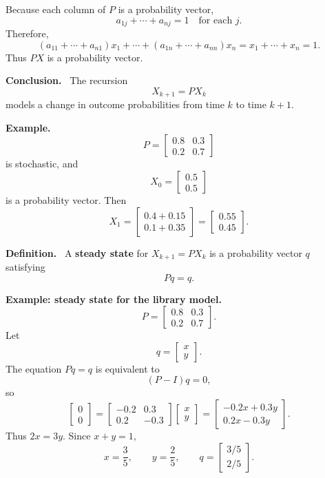 \documentclass[letterpaper]{article}
\newcommand{\noteheader}[1]{\par\medskip\noindent\textbf{#1}\ }
\begin{document}
\clearpage

Because each column of $P$ is a probability vector,
\[
a_{1j}+\cdots+a_{nj}=1
\quad\text{for each }j.
\]
Therefore,
\[
(a_{11}+\cdots+a_{n1})x_1+\cdots+(a_{1n}+\cdots+a_{nn})x_n
=x_1+\cdots+x_n=1.
\]
Thus $PX$ is a probability vector.

\bigskip

\noteheader{Conclusion.} The recursion
\[
X_{k+1}=PX_k
\]
models a change in outcome probabilities from time $k$ to time $k+1$.

\noteheader{Example.}
\[
P=\begin{bmatrix}0.8&0.3\\0.2&0.7\end{bmatrix}
\]
is stochastic, and
\[
X_0=\begin{bmatrix}0.5\\0.5\end{bmatrix}
\]
is a probability vector. Then
\[
X_1=
\begin{bmatrix}0.4+0.15\\0.1+0.35\end{bmatrix}
=\begin{bmatrix}0.55\\0.45\end{bmatrix}.
\]

\bigskip

\noteheader{Definition.} A \textbf{steady state} for $X_{k+1}=PX_k$ is a probability vector $q$ satisfying
\[
Pq=q.
\]

\clearpage

\textbf{Example: steady state for the library model.}
\[
P=\begin{bmatrix}0.8&0.3\\0.2&0.7\end{bmatrix}.
\]
Let
\[
q=\begin{bmatrix}x\\y\end{bmatrix}.
\]
The equation $Pq=q$ is equivalent to
\[
(P-I)q=0,
\]
so
\[
\begin{bmatrix}0\\0\end{bmatrix}
=\begin{bmatrix}-0.2&0.3\\0.2&-0.3\end{bmatrix}
\begin{bmatrix}x\\y\end{bmatrix}
=\begin{bmatrix}-0.2x+0.3y\\0.2x-0.3y\end{bmatrix}.
\]
Thus $2x=3y$. Since $x+y=1$,
\[
x=\frac35,
\qquad y=\frac25,
\qquad q=\begin{bmatrix}3/5\\2/5\end{bmatrix}.
\]
\end{document}
